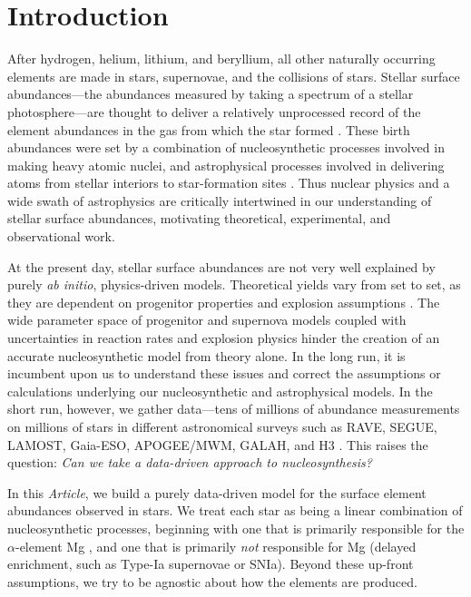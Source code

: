 \documentclass[modern]{aastex631}
\newcommand{\documentname}{\textsl{Article}}
\begin{document}
 
\section{Introduction}\label{sec:intro}

After hydrogen, helium, lithium, and beryllium, all other naturally occurring elements are made in stars, supernovae, and the collisions of stars.
Stellar surface abundances---the abundances measured by taking a spectrum of a stellar photosphere---are thought to deliver a relatively unprocessed record of the element abundances in the gas from which the star formed \citep[though see, e.g.,][]{pinsonneault2001, oh2018, souto2019, vincenzo2021b}.
These birth abundances were set by a combination of nucleosynthetic processes involved in making heavy atomic nuclei, and astrophysical processes involved in delivering atoms from stellar interiors to star-formation sites \citep[e.g.,][]{johnsonja2020}.
Thus nuclear physics and a wide swath of astrophysics are critically intertwined in our understanding of stellar surface abundances, motivating theoretical, experimental, and observational work.

At the present day, stellar surface abundances are not very well explained by purely \textsl{ab initio}, physics-driven models.
Theoretical yields vary from set to set, as they are dependent on progenitor properties and explosion assumptions \citep[e.g.,][]{rybizki2017, blancato2019, buck2021, griffith2021b}. 
The wide parameter space of progenitor and supernova models coupled with uncertainties in reaction rates and explosion physics hinder the creation of an accurate nucleosynthetic model from theory alone.
In the long run, it is incumbent upon us to understand these issues and correct the assumptions or calculations underlying our nucleosynthetic and astrophysical models.
In the short run, however, we gather data---tens of millions of abundance measurements on millions of stars in different astronomical surveys such as RAVE, SEGUE, LAMOST, Gaia-ESO, APOGEE/MWM, GALAH, and H3 \citep{steinmetz2006, yanny2009, gilmore2012, desilva2015, luo2015, majewski2017, conroy2019}.
This raises the question: \emph{Can we take a data-driven approach to nucleosynthesis?}

In this \documentname{}, we build a purely data-driven model for the surface element abundances observed in stars.
We treat each star as being a linear combination of nucleosynthetic processes, beginning with one that is primarily responsible for the $\alpha$-element Mg \citep[prompt enrichment, such as core-collapse supernovae or CCSN, e.g.,][]{andrews2017}, and one that is primarily \emph{not} responsible for Mg (delayed enrichment, such as Type-Ia supernovae or SNIa).
Beyond these up-front assumptions, we try to be agnostic about how the elements are produced.
\end{document}
